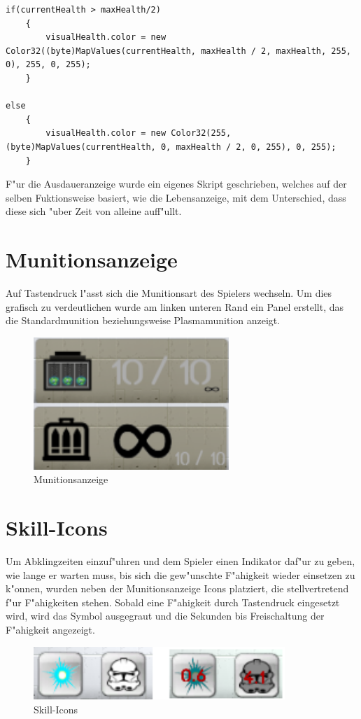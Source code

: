 \begin{lstlisting}[breaklines=true]
if(currentHealth > maxHealth/2)
	{
		visualHealth.color = new Color32((byte)MapValues(currentHealth, maxHealth / 2, maxHealth, 255, 0), 255, 0, 255);
	}

else
	{
		visualHealth.color = new Color32(255, (byte)MapValues(currentHealth, 0, maxHealth / 2, 0, 255), 0, 255);
	}

\end{lstlisting}

F"ur die Ausdaueranzeige wurde ein eigenes Skript geschrieben, welches auf der selben Fuktionsweise basiert, wie die Lebensanzeige, mit dem Unterschied, dass diese sich "uber Zeit von alleine auff"ullt. 
\newpage
\section{Munitionsanzeige}
Auf Tastendruck l"asst sich die Munitionsart des Spielers wechseln. Um dies grafisch zu verdeutlichen wurde am linken unteren Rand ein Panel erstellt, das die Standardmunition beziehungsweise Plasmamunition anzeigt. 
\begin{figure}
	\centering
	\includegraphics[height=5cm]{images/Munitionsanzeige.png}
	\caption{Munitionsanzeige}
	\label{fig:Munitionsanzeige-HUD}
\end{figure}

\section{Skill-Icons}
Um Abklingzeiten einzuf"uhren und dem Spieler einen Indikator daf"ur zu geben, wie lange er warten muss, bis sich die gew"unschte F"ahigkeit wieder einsetzen zu k"onnen, wurden neben der Munitionsanzeige Icons platziert, die stellvertretend f"ur F"ahigkeiten stehen. Sobald eine F"ahigkeit durch Tastendruck eingesetzt wird, wird das Symbol ausgegraut und die Sekunden bis Freischaltung der F"ahigkeit angezeigt. 
\begin{figure}
	\centering
	\includegraphics[height=2cm]{images/Skillicons.png}
	\caption{Skill-Icons}
	\label{fig:Skill-Icons-HUD}
\end{figure}